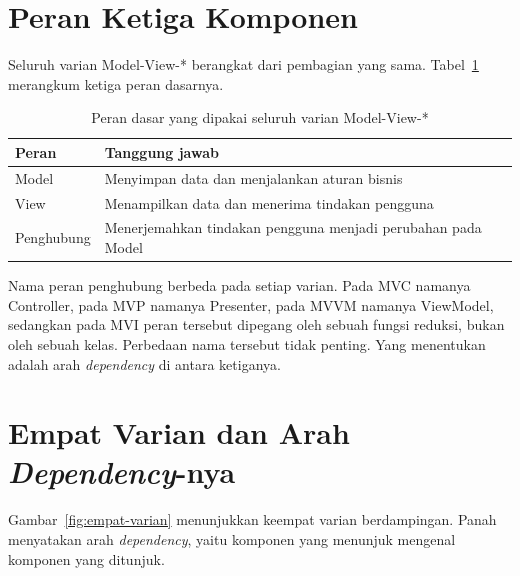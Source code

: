 \section{Peran Ketiga Komponen}

Seluruh varian Model-View-* berangkat dari pembagian yang sama.
Tabel~\ref{tab:peran-mv} merangkum ketiga peran dasarnya.

\begin{table}[htbp]
  \centering
  \caption{Peran dasar yang dipakai seluruh varian Model-View-*}
  \label{tab:peran-mv}
  \begin{tabularx}{\textwidth}{|l|X|}
    \hline
    \textbf{Peran} & \textbf{Tanggung jawab} \\
    \hline
    Model & Menyimpan data dan menjalankan aturan bisnis \\
    \hline
    View & Menampilkan data dan menerima tindakan pengguna \\
    \hline
    Penghubung & Menerjemahkan tindakan pengguna menjadi perubahan pada Model \\
    \hline
  \end{tabularx}
\end{table}

Nama peran penghubung berbeda pada setiap varian. Pada MVC namanya Controller,
pada MVP namanya Presenter, pada MVVM namanya ViewModel, sedangkan pada MVI
peran tersebut dipegang oleh sebuah fungsi reduksi, bukan oleh sebuah kelas.
Perbedaan nama tersebut tidak penting. Yang menentukan adalah arah
\textit{dependency} di antara ketiganya.

\section{Empat Varian dan Arah \textit{Dependency}-nya}

Gambar~\ref{fig:empat-varian} menunjukkan keempat varian berdampingan. Panah
menyatakan arah \textit{dependency}, yaitu komponen yang menunjuk mengenal komponen
yang ditunjuk.

